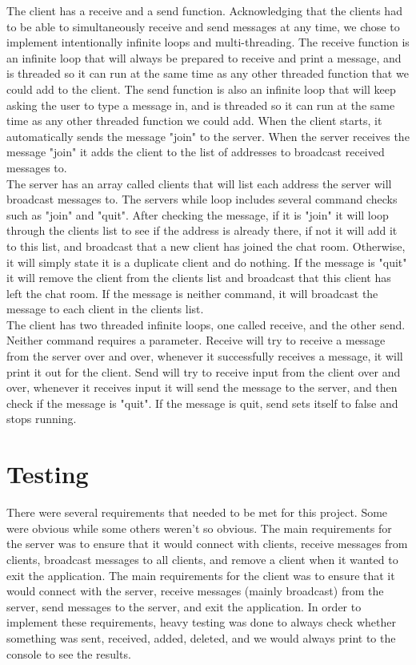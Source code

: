 \documentclass[12pt]{report}
\begin{document}
\noindent
The client has a receive and a send function. Acknowledging that the clients had to be able to simultaneously receive and send messages at any time, we chose to implement intentionally infinite loops and multi-threading. The receive function is an infinite loop that will always be prepared to receive and print a message, and is threaded so it can run at the same time as any other threaded function that we could add to the client. The send function is also an infinite loop that will keep asking the user to type a message in, and is threaded so it can run at the same time as any other threaded function we could add. When the client starts, it automatically sends the message "join" to the server. When the server receives the message "join" it adds the client to the list of addresses to broadcast received messages to. \\

\noindent
The server has an array called clients that will list each address the server will broadcast messages to. The servers while loop includes several command checks such as "join" and "{quit}". After checking the message, if it is "join" it will loop through the clients list to see if the address is already there, if not it will add it to this list, and broadcast that a new client has joined the chat room. Otherwise, it will simply state it is a duplicate client and do nothing. If the message is "{quit}" it will remove the client from the clients list and broadcast that this client has left the chat room. If the message is neither command, it will broadcast the message to each client in the clients list. \\

\noindent
The client has two threaded infinite loops, one called receive, and the other send. Neither command requires a parameter. Receive will try to receive a message from the server over and over, whenever it successfully receives a message, it will print it out for the client. Send will try to receive input from the client over and over, whenever it receives input it will send the message to the server, and then check if the message is "{quit}". If the message is quit, send sets itself to false and stops running.

\section{Testing}
There were several requirements that needed to be met for this project. Some were obvious while some others weren't so obvious. The main requirements for the server was to ensure that it would connect with clients, receive messages from clients, broadcast messages to all clients, and remove a client when it wanted to exit the application. The main requirements for the client was to ensure that it would connect with the server, receive messages (mainly broadcast) from the server, send messages to the server, and exit the application. In order to implement these requirements, heavy testing was done to always check whether something was sent, received, added, deleted, and we would always print to the console to see the results. \\
\end{document}
